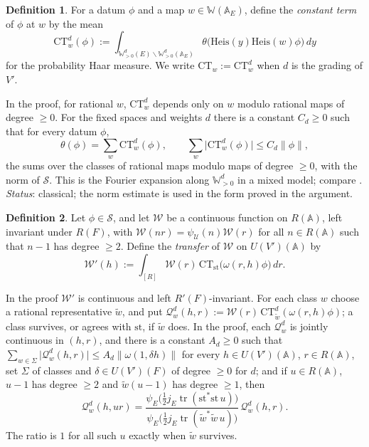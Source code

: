 \documentclass[reqno]{amsart}
\theoremstyle{definition}
\newtheorem{definition}{Definition}[section]
\theoremstyle{plain}
\theoremstyle{remark}
\newcommand{\A}{\mathbb{A}}
\newcommand{\Uc}{\mathcal{U}}
\newcommand{\Wc}{\mathcal{W}}
\newcommand{\Sc}{\mathcal{S}}
\newcommand{\WW}{\mathbb{W}}
\newcommand{\st}{\mathrm{st}}
\newcommand{\CT}{\mathrm{CT}}
\newcommand{\Heis}{\mathrm{Heis}}
\newcommand{\tr}{\operatorname{tr}}
\begin{document}
\begin{definition}\label{def:ct}
For a datum \(\phi\) and a map \(w\in\WW(\A_E)\), define the \emph{constant term} of \(\phi\) at \(w\) by the mean
\[
  \CT^d_w(\phi):=\int_{\WW^d_{>0}(E)\backslash\WW^d_{>0}(\A_E)}\theta\bigl(\Heis(y)\Heis(w)\phi\bigr)\,dy
\]
for the probability Haar measure.  We write \(\CT_w:=\CT^d_w\) when \(d\) is the grading of \(V'\).
\end{definition}

In the proof, for rational \(w\), \(\CT^d_w\) depends only on \(w\) modulo rational maps of degree \(\ge0\).  For the fixed spaces and weights \(d\) there is a constant \(C_d\ge0\) such that for every datum \(\phi\),
\[
  \theta(\phi)=\sum_w\CT^d_w(\phi),\qquad \sum_w\lvert\CT^d_w(\phi)\rvert\le C_d\lVert \phi\rVert,
\]
the sums over the classes of rational maps modulo maps of degree \(\ge0\), with the norm of \(\Sc\).  This is the Fourier expansion along \(\WW^d_{>0}\) in a mixed model; compare \cite{We}.  \emph{Status}: classical; the norm estimate is used in the form proved in the argument.

\begin{definition}\label{def:transfer}
Let \(\phi\in\Sc\), and let \(\Wc\) be a continuous function on \(R(\A)\), left invariant under \(R(F)\), with \(\Wc(nr)=\psi_\Uc(n)\Wc(r)\) for all \(n\in R(\A)\) such that \(n-1\) has degree \(\ge2\).  Define the \emph{transfer} of \(\Wc\) on \(U(V')(\A)\) by
\[
  \Wc'(h):=\int_{[R]}\Wc(r)\,\CT_\st\bigl(\omega(r,h)\phi\bigr)\,dr .
\]
\end{definition}

In the proof \(\Wc'\) is continuous and left \(R'(F)\)-invariant.  For each class \(w\) choose a rational representative \(\tilde w\), and put \(\mathcal Q^d_w(h,r):=\Wc(r)\,\CT^d_{\tilde w}(\omega(r,h)\phi)\); a class survives, or agrees with \(\st\), if \(\tilde w\) does.  In the proof, each \(\mathcal Q^d_w\) is jointly continuous in \((h,r)\), and there is a constant \(A_d\ge0\) such that \(\sum_{w\in\Sigma}\lvert\mathcal Q^d_w(h,r)\rvert\le A_d\lVert\omega(1,\delta h)\rVert\) for every \(h\in U(V')(\A)\), \(r\in R(\A)\), set \(\Sigma\) of classes and \(\delta\in U(V')(F)\) of degree \(\ge0\) for \(d\); and if \(u\in R(\A)\), \(u-1\) has degree \(\ge2\) and \(\tilde w(u-1)\) has degree \(\ge1\), then
\[
  \mathcal Q^d_w(h,ur)=\frac{\psi_E\bigl(\frac12j_E\tr(\st^*\st\,u)\bigr)}{\psi_E\bigl(\frac12j_E\tr(\tilde w^*\tilde w\,u)\bigr)}\,\mathcal Q^d_w(h,r).
\]
The ratio is \(1\) for all such \(u\) exactly when \(\tilde w\) survives.
\end{document}
